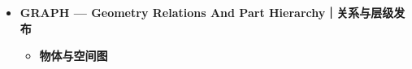 \documentclass[UTF8,fontset=fandol]{ctexart}
\begin{document}
\begin{itemize}
\begin{itemize}
\begin{itemize}
\begin{itemize}
\item 唯一上表面沿连接持续有实测支持、立面高度及语义一致、多视角共同出现，才归并整柜。


\item 门板保留为part，原实测坐标取并集；反复审核至无新关系。

\end{itemize}

\item \textbf{FDR — Fine Depth Recovery｜精细实测恢复}


\begin{itemize}
\item 小物体在原生身份掩码内使用逐像素深度、2毫米体素和至少3个独立视角；保留真实坐标。

\end{itemize}

\item \textbf{RSI — Repeated Surface Instances｜重复表面实例}


\begin{itemize}
\item RGB-D外缘沿高度出现多视角稳定周期时才拆分；实例数来自实测边缘，不来自类别或GT。


\item 顶部实测曲面作为共享先验，下层平移曲面标为生成；自由空间与原点残差否决不成立的假设。

\end{itemize}
\end{itemize}

\item \textbf{形状先验及验收}


\begin{itemize}
\item AdaPoinTr保持独立验收；在实测整体/部件归并后，由缓存名称选择形状族，实测正面、侧面、后界决定尺寸，全部帧检验形状假设。


\item 只发布通过当前准入的形状假设；生成点不充当实测或跟踪证据。

\end{itemize}
\end{itemize}

\item \textbf{GRAPH — Geometry Relations And Part Hierarchy｜关系与层级发布}


\begin{itemize}
\item \textbf{物体与空间图}



\end{itemize}
\end{itemize}
\end{document}
